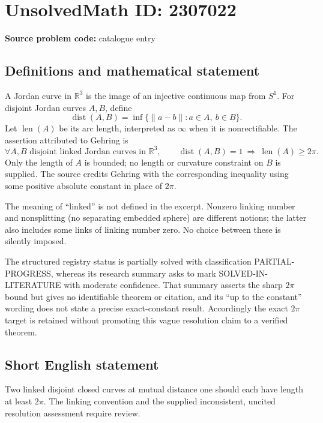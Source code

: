 \documentclass[11pt]{article}
\newcommand{\R}{\mathbb{R}}
\begin{document}
\section*{UnsolvedMath ID: 2307022}
\textbf{Source problem code:} catalogue entry
\subsection{Definitions and mathematical statement}
A Jordan curve in \(\R^3\) is the image of an injective continuous map from \(S^1\). For disjoint Jordan curves \(A,B\), define
\[
\operatorname{dist}(A,B)=\inf\{\|a-b\|:a\in A,\ b\in B\}.
\]
Let \(\operatorname{len}(A)\) be its arc length, interpreted as \(\infty\) when it is nonrectifiable. The assertion attributed to Gehring is
\[
\forall A,B\text{ disjoint linked Jordan curves in }\R^3,
\qquad\operatorname{dist}(A,B)=1\ \Longrightarrow\
\operatorname{len}(A)\ge2\pi.
\]
Only the length of \(A\) is bounded; no length or curvature constraint on \(B\) is supplied. The source credits Gehring with the corresponding inequality using some positive absolute constant in place of \(2\pi\).

The meaning of ``linked'' is not defined in the excerpt. Nonzero linking number and nonsplitting (no separating embedded sphere) are different notions; the latter also includes some links of linking number zero. No choice between these is silently imposed.

The structured registry status is partially solved with classification PARTIAL-PROGRESS, whereas its research summary asks to mark SOLVED-IN-LITERATURE with moderate confidence. That summary asserts the sharp \(2\pi\) bound but gives no identifiable theorem or citation, and its ``up to the constant'' wording does not state a precise exact-constant result. Accordingly the exact \(2\pi\) target is retained without promoting this vague resolution claim to a verified theorem.
\subsection{Short English statement}
Two linked disjoint closed curves at mutual distance one should each have length at least \(2\pi\). The linking convention and the supplied inconsistent, uncited resolution assessment require review.
\end{document}
